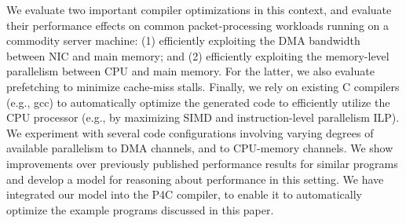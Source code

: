 We evaluate two important compiler optimizations in this context, and evaluate their performance
effects on common packet-processing workloads running on a commodity server machine: (1) efficiently exploiting
the DMA bandwidth between NIC and main memory; and (2) efficiently exploiting the memory-level
parallelism between CPU and main memory. For the latter, we also evaluate prefetching to minimize
cache-miss stalls. Finally, we rely on existing C compilers (e.g., gcc) to automatically optimize
the generated code to efficiently utilize the CPU processor (e.g., by maximizing SIMD
and instruction-level parallelism ILP). We experiment with several code configurations involving varying
degrees of available parallelism to DMA channels, and to CPU-memory channels. We show
improvements over previously published performance results for similar programs and develop a model
for reasoning about performance in this setting. We have integrated our model into the
P4C compiler, to enable it to
automatically optimize the example programs discussed in this paper.
